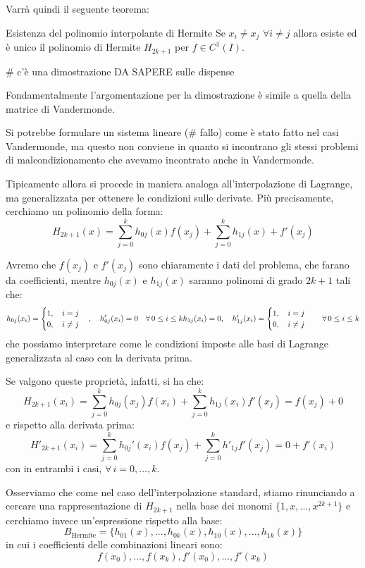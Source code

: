 \documentclass[a4paper,11pt]{article}
\begin{document}
Varrà quindi il seguente teorema:
\begin{theorem}{Esistenza del polinomio interpolante di Hermite}
	Se $x_i \neq x_j$ $\forall i \neq j$ allora esiste ed è unico il polinomio di Hermite $H_{2k + 1}$ per $f \in C^1(I)$. 
\end{theorem}

# c'è una dimostrazione DA SAPERE sulle dispense 

Fondamentalmente l'argomentazione per la dimostrazione è simile a quella della matrice di Vandermonde.

Si potrebbe formulare un sistema lineare (# fallo) come è stato fatto nel casi Vandermonde, ma questo non conviene in quanto si incontrano gli stessi problemi di malcondizionamento che avevamo incontrato anche in Vandermonde.

Tipicamente allora si procede in maniera analoga all'interpolazione di Lagrange, ma generalizzata per ottenere le condizioni sulle derivate.
Più precisamente, cerchiamo un polinomio della forma:
$$
H_{2k + 1}(x) = \sum_{j = 0}^k h_{0j}(x) f(x_j) + \sum_{j = 0}^k h_{1j}(x) + f'(x_j)
$$

Avremo che $f(x_j)$ e $f'(x_j)$ sono chiaramente i dati del problema, che farano da coefficienti, mentre $h_{0j}(x)$ e $h_{1j}(x)$ saranno polinomi di grado $2k + 1$ tali che:
\begin{equation}
h_{0j}(x_i) =
\begin{cases}
	1, \quad i = j \\
	0, \quad i \neq j
\end{cases}, \quad
h'_{0j}(x_i) = 0  \quad \forall \, 0 \leq i \leq k
$$
$$
h_{1j}(x_i) = 0, \quad
h'_{1j}(x_i) =
\begin{cases}
	1, \quad i = j \\
	0, \quad i \neq j
\end{cases} \quad \forall \, 0 \leq i \leq k
\end{equation}
che possiamo interpretare come le condizioni imposte alle basi di Lagrange generalizzata al caso con la derivata prima.

Se valgono queste proprietà, infatti, si ha che:
$$
H_{2k + 1}(x_i) = \sum_{j = 0}^k h_{0j}(x_j) f(x_i) + \sum_{j = 0}^k h_{1j}(x_i) f'(x_j) = f(x_j) + 0 
$$
e rispetto alla derivata prima:
$$
H'_{2k + 1}(x_i) = \sum_{j = 0}^k h_{0j}'(x_i) f(x_j) + \sum_{j = 0}^k h'_{1j}f'(x_j) = 0 + f'(x_i)
$$
con in entrambi i casi, $\forall \, i = 0, ..., k$.

Osserviamo che come nel caso dell'interpolazione standard, stiamo rinunciando a cercare una rappresentazione di $H_{2k + 1}$ nella base dei monomi $\{ 1, x, ..., x^{2k + 1} \}$ e cerchiamo invece un'espressione rispetto alla base:
$$
	B_\text{Hermite} = \{ h_{01}(x), ..., h_{0k}(x), h_{10}(x), ..., h_{1k}(x) \}
$$
in cui i coefficienti delle combinazioni lineari sono:
$$
f(x_0), ..., f(x_k), f'(x_0), ..., f'(x_k)
$$
\end{document}
